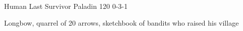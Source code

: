 \begin{filledCS}%
  {\composeHumanName}%
  {Human}%
  {Last Survivor}%
  {Paladin}%
  {{1}{2}{0}}%
  {{0}{-3}{-1}}%
  {%
    \setcounter{Cultivation}{2}
    \setcounter{Performance}{1}
    \setcounter{Stealth}{1}
    \setcounter{Brawl}{1}
    \setcounter{Projectiles}{1}
    \Dagger
    \addtocounter{equipmentWeight}{3}
  }%
  {\unstoppable}%
  {Longbow, quarrel of 20 arrows, sketchbook of bandits who raised his \gls{village}}%

  \renewcommand\rank{Fodder}
  \renewcommand\characterDebt{100 \glspl{sp}}

\end{filledCS}

